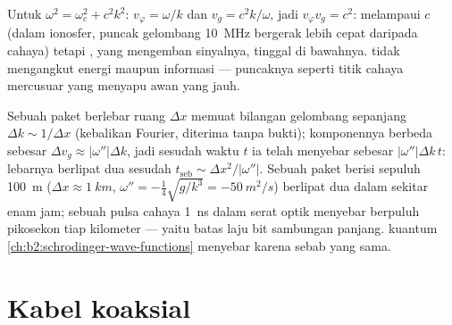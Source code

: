 \begin{example}\label{ex:b2:dispersion-wave-packets:superluminal}
Untuk $\omega^2 = \omega_c^2 + c^2k^2$: $v_\varphi = \omega/k$ dan $v_g = c^2k/\omega$, jadi
$v_\varphi v_g = c^2$:  melampaui $c$ (dalam ionosfer, puncak
gelombang \qty{10}{MHz} bergerak lebih cepat daripada cahaya) tetapi , yang mengemban sinyalnya, tinggal di bawahnya. 
tidak mengangkut energi maupun informasi --- puncaknya seperti
titik cahaya mercusuar yang menyapu awan yang jauh.
\end{example}

\begin{remark}[Penyebaran]\label{rem:b2:dispersion-wave-packets:spreading}
Sebuah paket berlebar ruang $\Delta x$ memuat bilangan gelombang sepanjang $\Delta k \sim
1/\Delta x$ (kebalikan Fourier, diterima tanpa bukti); 
komponennya berbeda sebesar $\Delta v_g \approx |\omega''|\Delta k$, jadi sesudah waktu $t$ ia
telah menyebar sebesar $|\omega''|\Delta k\,t$: lebarnya berlipat dua sesudah $t_{\text{seb}}
\sim \Delta x^2/|\omega''|$. Sebuah paket berisi sepuluh  \qty{100}{m}
($\Delta x \approx \qty{1}{km}$, $\omega'' = -\tfrac14\sqrt{g/k^3} = \qty{-50}{m^2/s}$)
berlipat dua dalam sekitar enam jam; sebuah pulsa cahaya \qty{1}{ns} dalam
serat optik menyebar berpuluh pikosekon tiap kilometer --- yaitu
batas laju bit sambungan panjang.  kuantum
\cref{ch:b2:schrodinger-wave-functions} menyebar karena sebab yang sama.
\end{remark}

\section{Kabel koaksial}

